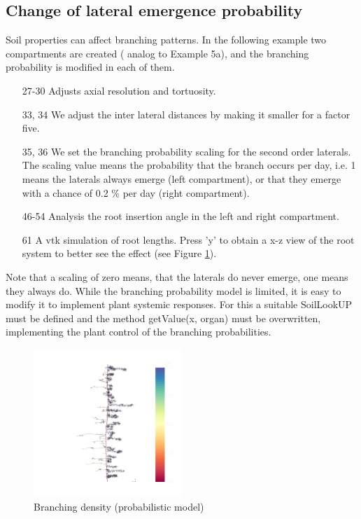 \subsection{Change of lateral emergence probability} \label{sec:branching}

Soil properties can affect branching patterns. In the following example two compartments are created ( analog to Example 5a), and the branching probability is modified in each of them.



\begin{itemize}

\item[27-30] Adjusts axial resolution and tortuosity.

\item[33, 34] We adjust the inter lateral distances by making it smaller for a factor five.

\item[35, 36] We set the branching probability scaling for the second order laterals. The scaling value means the probability that the branch occurs per day, i.e. 1 means the laterals always emerge (left compartment), or that they emerge with a chance of 0.2 \% per day (right compartment). 

\item[46-54] Analysis the root insertion angle in the left and right compartment. 

\item[61] A vtk simulation of root lengths. Press 'y' to obtain a x-z view of the root system to better see the effect (see Figure \ref{fig:probability}). 

\end{itemize}

Note that a scaling of zero means, that the laterals do never emerge, one means they always do. While the branching probability model is limited, it is easy to modify it to implement plant systemic responses. For this a suitable SoilLookUP must be defined and the method getValue(x, organ) must be overwritten, implementing the plant control of the branching probabilities. 

\begin{figure}
\centering
\includegraphics[width=0.5\textwidth]{example5d.png}
\caption{Branching density (probabilistic model)} \label{fig:probability}
\end{figure}
